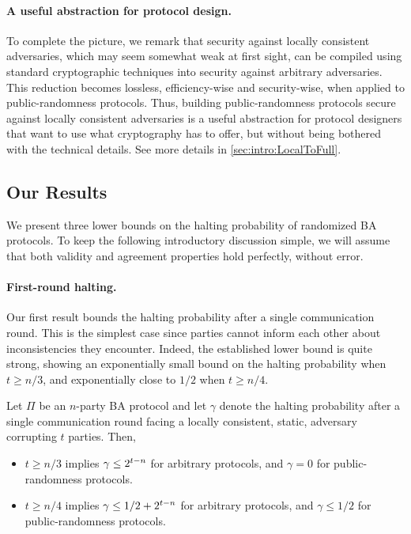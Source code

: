 \paragraph{A useful abstraction  for protocol design.}
To complete the picture, we remark that security against locally consistent adversaries, which  may seem somewhat weak at first sight, can be compiled using standard cryptographic techniques into security against arbitrary adversaries. This reduction  becomes lossless, efficiency-wise and security-wise, when applied to public-randomness protocols. Thus, building public-randomness protocols secure against locally consistent adversaries is a useful abstraction for protocol designers that  want to use what  cryptography has to offer, but  without being bothered with the technical details.
See more details in \cref{sec:intro:LocalToFull}.

\subsection{Our Results}\label{sec:intro:ourResult}
We present three lower bounds on the halting probability of randomized BA protocols.
To keep the following introductory discussion simple, we will assume that both validity and agreement properties hold perfectly, without error.

\paragraph{First-round halting.}
Our first result bounds the halting probability after a single communication round. This is the simplest case since parties cannot inform each other about inconsistencies they encounter. Indeed, the established lower bound is quite strong, showing an exponentially small bound on the halting probability when $t\geq n/3$, and exponentially close to $1/2$ when $t\geq n/4$.

\begin{theorem}\label{thm:intro:FirstRound}
Let $\Pi$ be an $n$-party BA protocol and let $\gamma$ denote the halting probability after a single communication round facing a locally consistent, static,  adversary  corrupting $t$ parties. Then,
\begin{itemize}
	\item $t \ge n/3$ implies $\gamma \le 2^{t-n}$ for arbitrary protocols, and $\gamma=0$ for public-randomness protocols.
	\item $t \ge n/4$ implies $\gamma \le 1/2+2^{t-n}$ for arbitrary protocols, and $\gamma \leq 1/2$ for public-randomness protocols.
\end{itemize}
\end{theorem}


